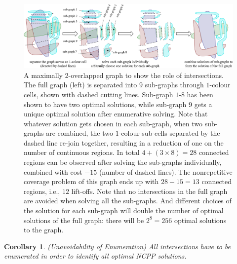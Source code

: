 \documentclass[journal]{IEEEtran}
\newtheorem{corollary}[theorem]{Corollary}
\begin{document}
\begin{figure}[t]
\centering
\includegraphics[width=\textwidth]{figures/two_overlapped_graph_2}
\caption{A maximally 2-overlapped graph to show the role of intersections. The full graph (left) is separated into $9$ sub-graphs through $1$-colour cells, shown with dashed cutting lines. Sub-graph $1$-$8$ has been shown to have two optimal solutions, while sub-graph $9$ gets a unique optimal solution after enumerative solving. Note that whatever solution gets chosen in each sub-graph, when two sub-graphs are combined, the two $1$-colour sub-cells separated by the dashed line re-join together, resulting in a reduction of one on the number of continuous regions. In total $4+(3\times 8)=28$ connected regions can be observed after solving the sub-graphs individually, combined with cost $-15$ (number of dashed lines). The nonrepetitive coverage problem of this graph ends up with $28-15=13$ connected regions, i.e., $12$ lift-offs. 
Note that no intersections in the full graph are avoided when solving all the sub-graphs. And different choices of the solution for each sub-graph will double the number of optimal solutions of the full graph: there will be $2^8=256$ optimal solutions to the graph.
}
\label{fig:two_overlapped_graph}
\end{figure}


\begin{corollary}\label{coro:enum}
(Unavoidability of Enumeration) All intersections have to be enumerated in order to identify all optimal NCPP solutions. 
\end{corollary}
\end{document}
